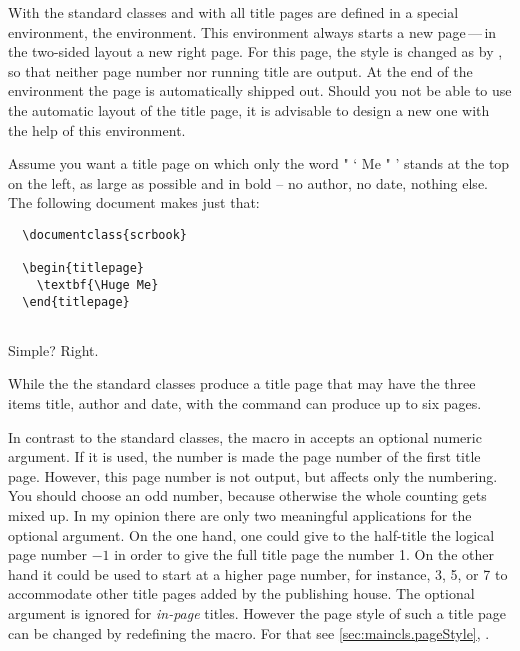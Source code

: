 \begin{Declaration}
\end{Declaration}%
%
With the standard classes and with {\KOMAScript} all title pages are
defined in a special environment, the 
environment.  This environment always starts a new page\,---\,in the
two-sided layout a new right page. For this page, the style is changed
as by , so that neither page
number nor running title are output. At the end of the environment the
page is automatically shipped out. Should you not be able to use the
automatic layout of the title page, it is advisable to design a new
one with the help of this environment.


\begin{Example}
  Assume you want a title page on which only the word " ` Me " '
  stands at the top on the left, as large as possible and in bold --
  no author, no date, nothing else. The following document makes just
  that:
\begin{lstlisting}
  \documentclass{scrbook}
  
  \begin{titlepage}
    \textbf{\Huge Me}
  \end{titlepage}
  
\end{lstlisting}
  Simple? Right.
\end{Example}
%

\begin{Declaration}
\end{Declaration}%
%
While the the standard classes produce a title page that may have the three
items title, author and date, with {\KOMAScript} the  command
can produce up to six pages.

In contrast to the standard classes, the  macro in
{\KOMAScript} accepts an optional numeric argument. If it is used, the number
is made the page number of the first title page.  However, this page number is
not output, but affects only the numbering. You should choose an odd number,
because otherwise the whole counting gets mixed up. In my opinion there are
only two meaningful applications for the optional argument. On the one hand,
one could give to the half-title the logical page
number \(-1\) in order to give the full title page the number 1. On the other
hand it could be used to start at a higher page number, for instance, 3, 5, or
7 to accommodate other title pages added by the publishing house.  The
optional argument is ignored for \emph{in-page} titles. However the page style
of such a title page can be changed by redefining the 
macro.  For that see \autoref{sec:maincls.pageStyle},
.

